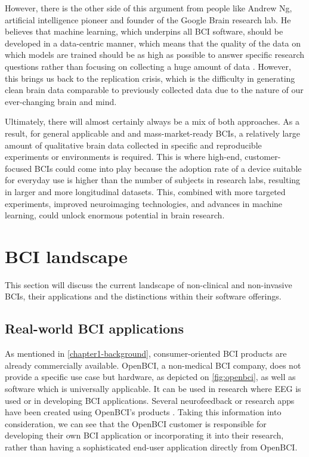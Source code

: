 However, there is the other side of this argument from people like Andrew Ng, artificial intelligence pioneer and founder of the Google Brain research lab. He believes that machine learning, which underpins all BCI software, should be developed in a data-centric manner, which means that the quality of the data on which models are trained should be as high as possible to answer specific research questions rather than focusing on collecting a huge amount of data \citep{brown_why_2022}. However, this brings us back to the replication crisis, which is the difficulty in generating clean brain data comparable to previously collected data due to the nature of our ever-changing brain and mind.

Ultimately, there will almost certainly always be a mix of both approaches. As a result, for general applicable and and mass-market-ready BCIs, a relatively large amount of qualitative brain data collected in specific and reproducible experiments or environments is required. This is where high-end, customer-focused BCIs could come into play because the adoption rate of a device suitable for everyday use is higher than the number of subjects in research labs, resulting in larger and more longitudinal datasets. This, combined with more targeted experiments, improved neuroimaging technologies, and advances in machine learning, could unlock enormous potential in brain research.

\section{BCI landscape}
\label{chapter2-research-landscape}

This section will discuss the current landscape of non-clinical and non-invasive BCIs, their applications and the distinctions within their software offerings.

\subsection{Real-world BCI applications}
\label{chapter2-real-world-bci-applications}

As mentioned in \autoref{chapter1-background}, consumer-oriented BCI products are already commercially available. OpenBCI, a non-medical BCI company, does not provide a specific use case but hardware, as depicted on \autoref{fig:openbci}, as well as software which is universally applicable. It can be used in research where EEG is used or in developing BCI applications. Several neurofeedback or research apps have been created using OpenBCI's products \citep{openbci_openbci_nodate}. Taking this information into consideration, we can see that the OpenBCI customer is responsible for developing their own BCI application or incorporating it into their research, rather than having a sophisticated end-user application directly from OpenBCI.

